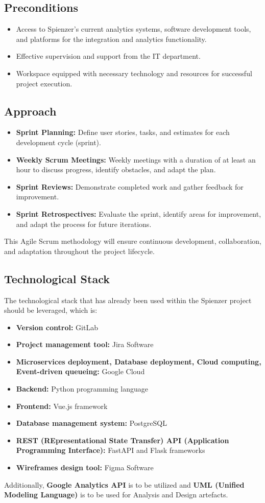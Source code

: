 \documentclass[12pt,a4paper]{article}
\begin{document}
\subsection{Preconditions}
\begin{itemize}
    \item Access to Spienzer's current analytics systems, software development tools, and platforms for the integration and analytics functionality.
    \item Effective supervision and support from the IT department.
    \item Workspace equipped with necessary technology and resources for successful project execution.
\end{itemize}
\subsection{Approach}
\begin{itemize}
    \item \textbf{Sprint Planning:} Define user stories, tasks, and estimates for each development cycle (sprint).
    \item \textbf{Weekly Scrum Meetings:} Weekly meetings with a duration of at least an hour to discuss progress, identify obstacles, and adapt the plan.
    \item \textbf{Sprint Reviews:} Demonstrate completed work and gather feedback for improvement.
    \item \textbf{Sprint Retrospectives:} Evaluate the sprint, identify areas for improvement, and adapt the process for future iterations.
\end{itemize}
This Agile Scrum methodology will ensure continuous development, collaboration, and adaptation throughout the project lifecycle.
\subsection{Technological Stack}
The technological stack that has already been used within the Spienzer project should be leveraged, which is: 
\begin{itemize}
    \item \textbf{Version control:} GitLab
    \item \textbf{Project management tool:} Jira Software
    \item \textbf{Microservices deployment, Database deployment, Cloud computing, Event-driven queueing:} Google Cloud
    \item \textbf{Backend:} Python programming language
    \item \textbf{Frontend:} Vue.js framework
    \item \textbf{Database management system:} PostgreSQL
    \item \textbf{REST (REpresentational State Transfer) API (Application Programming Interface):} FastAPI and Flask frameworks
    \item \textbf{Wireframes design tool:} Figma Software
\end{itemize}
Additionally, \textbf{Google Analytics API} is to be utilized and \textbf{UML (Unified Modeling Language)} is to be used for Analysis and Design artefacts.
\end{document}
